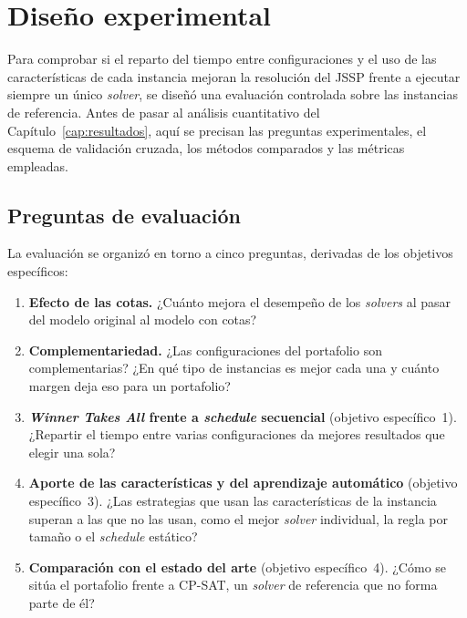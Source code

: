 \chapter{Diseño experimental}
\label{cap:diseno}

Para comprobar si el reparto del tiempo entre configuraciones y el uso de las
características de cada instancia mejoran la resolución del JSSP frente a
ejecutar siempre un único \textit{solver}, se diseñó una evaluación controlada
sobre las instancias de referencia. Antes de pasar al análisis cuantitativo del
Capítulo~\ref{cap:resultados}, aquí se precisan las preguntas experimentales,
el esquema de validación cruzada, los métodos comparados y las métricas
empleadas.

\section{Preguntas de evaluación}
\label{sec:preguntas}

La evaluación se organizó en torno a cinco preguntas, derivadas de los
objetivos específicos:

\begin{enumerate}[label=\textbf{P\arabic*.}, leftmargin=*]
  \item \textbf{Efecto de las cotas.} ¿Cuánto mejora el desempeño de los
    \textit{solvers} al pasar del modelo original al modelo con cotas?
  \item \textbf{Complementariedad.} ¿Las configuraciones del portafolio son
    complementarias? ¿En qué tipo de instancias es mejor cada una y cuánto
    margen deja eso para un portafolio?
  \item \textbf{\textit{Winner Takes All} frente a \textit{schedule}
    secuencial} (objetivo específico~1). ¿Repartir el tiempo entre varias
    configuraciones da mejores resultados que elegir una sola?
  \item \textbf{Aporte de las características y del aprendizaje automático}
    (objetivo específico~3). ¿Las estrategias que usan las características
    de la instancia superan a las que no las usan, como el mejor
    \textit{solver} individual, la regla por tamaño o el \textit{schedule}
    estático?
  \item \textbf{Comparación con el estado del arte} (objetivo
    específico~4). ¿Cómo se sitúa el portafolio frente a CP-SAT, un
    \textit{solver} de referencia que no forma parte de él?
\end{enumerate}

